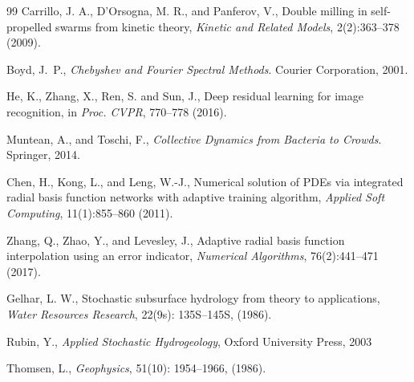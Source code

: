 \begin{thebibliography}{99}
Carrillo, J. A., D’Orsogna, M. R., and Panferov, V.,
Double milling in self-propelled swarms from kinetic theory,
\textit{Kinetic and Related Models}, 2(2):363--378 (2009).

Boyd, J.~P.,
\textit{Chebyshev and Fourier Spectral Methods}.
Courier Corporation, 2001.

He, K., Zhang, X., Ren, S. and Sun, J.,
Deep residual learning for image recognition,
in \textit{Proc. CVPR}, 770--778 (2016).

Muntean, A., and Toschi, F.,
\textit{Collective Dynamics from Bacteria to Crowds}.
Springer, 2014.


Chen, H., Kong, L., and Leng, W.-J.,
Numerical solution of PDEs via integrated radial basis function networks with adaptive training algorithm,
\textit{Applied Soft Computing}, 11(1):855--860 (2011).

Zhang, Q., Zhao, Y., and Levesley, J.,
Adaptive radial basis function interpolation using an error indicator,
\textit{Numerical Algorithms}, 76(2):441--471 (2017).

Gelhar, L. W.,
Stochastic subsurface hydrology from theory to applications,
\textit{Water Resources Research}, 22(9s): 135S--145S, (1986).

Rubin, Y.,
\textit{Applied Stochastic Hydrogeology}, Oxford University Press, 2003

Thomsen, L.,
\textit{Geophysics}, 51(10): 1954--1966, (1986).

\end{thebibliography}



